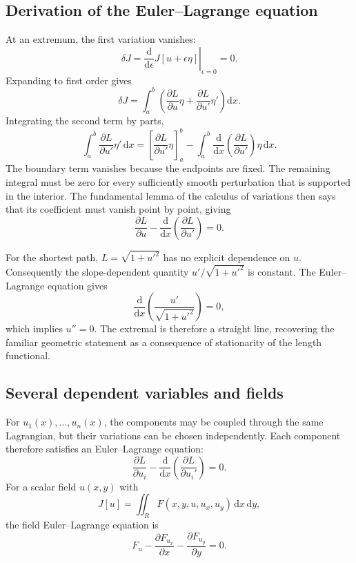 \subsection{Derivation of the Euler--Lagrange equation}
At an extremum, the first variation vanishes:
\begin{equation}
\delta J=\left.\frac{\mathrm{d}}{\mathrm{d}\epsilon}J[u+\epsilon\eta]\right|_{\epsilon=0}=0.
\end{equation}
Expanding to first order gives
\begin{equation}
\delta J=\int_a^b\left(
\frac{\partial L}{\partial u}\eta
+\frac{\partial L}{\partial u'}\eta'
\right)\mathrm{d}x.
\end{equation}
Integrating the second term by parts,
\begin{equation}
\int_a^b\frac{\partial L}{\partial u'}\eta'\,\mathrm{d}x
=\left[\frac{\partial L}{\partial u'}\eta\right]_a^b
-\int_a^b\frac{\mathrm{d}}{\mathrm{d}x}\left(\frac{\partial L}{\partial u'}\right)\eta\,\mathrm{d}x.
\end{equation}
The boundary term vanishes because the endpoints are fixed. The remaining integral must be zero for every sufficiently smooth perturbation that is supported in the interior. The fundamental lemma of the calculus of variations then says that its coefficient must vanish point by point, giving
\begin{equation}
\boxed{\frac{\partial L}{\partial u}
-\frac{\mathrm{d}}{\mathrm{d}x}\left(\frac{\partial L}{\partial u'}\right)=0.}
\end{equation}

For the shortest path, $L=\sqrt{1+u'^2}$ has no explicit dependence on $u$. Consequently the slope-dependent quantity $u'/\sqrt{1+u'^2}$ is constant. The Euler--Lagrange equation gives
\begin{equation}
\frac{\mathrm{d}}{\mathrm{d}x}\left(\frac{u'}{\sqrt{1+u'^2}}\right)=0,
\end{equation}
which implies $u''=0$. The extremal is therefore a straight line, recovering the familiar geometric statement as a consequence of stationarity of the length functional.

\subsection{Several dependent variables and fields}
For $u_1(x),\ldots,u_n(x)$, the components may be coupled through the same Lagrangian, but their variations can be chosen independently. Each component therefore satisfies an Euler--Lagrange equation:
\begin{equation}
\frac{\partial L}{\partial u_i}
-\frac{\mathrm{d}}{\mathrm{d}x}\left(\frac{\partial L}{\partial u_i'}\right)=0.
\end{equation}
For a scalar field $u(x,y)$ with
\begin{equation}
J[u]=\iint_R F(x,y,u,u_x,u_y)\,\mathrm{d}x\,\mathrm{d}y,
\end{equation}
the field Euler--Lagrange equation is
\begin{equation}
F_u-\frac{\partial F_{u_x}}{\partial x}
-\frac{\partial F_{u_y}}{\partial y}=0.
\end{equation}

